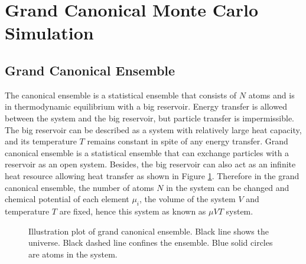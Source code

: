 \section{Grand Canonical Monte Carlo Simulation}
\label{Chap:Mech:GCMC}

\subsection{Grand Canonical Ensemble}

The canonical ensemble is a statistical ensemble that consists of $N$ atoms and is in thermodynamic equilibrium with a big reservoir. Energy transfer is allowed between the system and the big reservoir, but particle transfer is impermissible. The big reservoir can be described as a system with relatively large heat capacity, and its temperature $T$ remains constant in spite of any energy transfer. Grand canonical ensemble is a statistical ensemble that can exchange particles with a reservoir as an open system. Besides, the big reservoir can also act as an infinite heat resource allowing heat transfer as shown in Figure \ref{Chap:Meth:GCMC:fig1}. \cite{frenkel2001understanding} Therefore in the grand canonical ensemble, the number of atoms $N$ in the system can be changed and chemical potential of each element $\mu_i$, the volume of the system $V$ and temperature $T$ are fixed, hence this system as known as $\mu VT$ system.

\begingroup
\begin{figure}[!ht]
  \centering
  \caption[Illustration plot of grand canonical ensemble]{Illustration plot of grand canonical ensemble. Black line shows the universe. Black dashed line confines the ensemble. Blue solid circles are atoms in the system.}
  \label{Chap:Meth:GCMC:fig1}
\end{figure}
\endgroup

